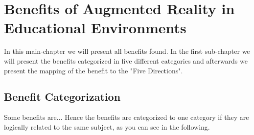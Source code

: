 \section{Benefits of Augmented Reality in Educational Environments}
In this main-chapter we will present all benefits found. In the first sub-chapter we will present the benefits categorized in five different categories and afterwards we present the mapping of the benefit to the "Five Directions".
\subsection{Benefit Categorization}
Some benefits are... Hence the benefits are categorized to one category if they are logically related to the same subject, as you can see in the following.
\label{subsec:Benefits}

% 
